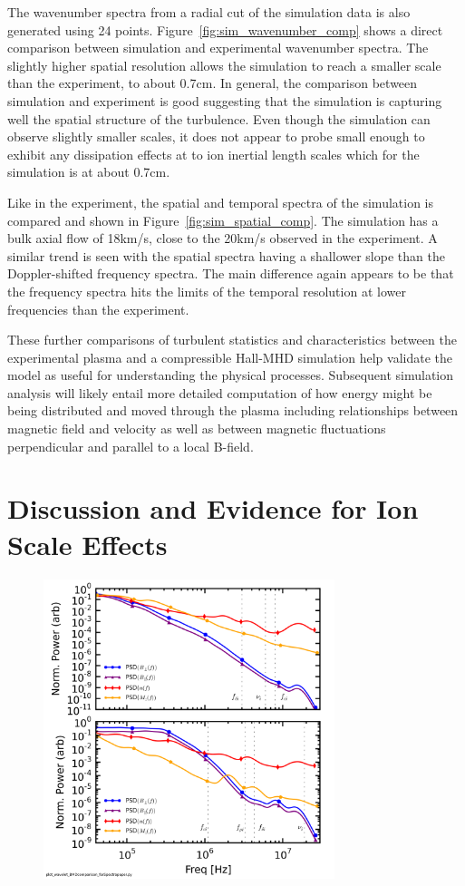\documentclass[aip,prl,amsmath,amssymb,reprint,superscriptaddress]{revtex4-1} %
\begin{document}
The wavenumber spectra from a radial cut of the simulation data is also generated using 24 points. Figure~\ref{fig:sim_wavenumber_comp} shows a direct comparison between simulation and experimental wavenumber spectra. The slightly higher spatial resolution allows the simulation to reach a smaller scale than the experiment, to about 0.7cm. In general, the comparison between simulation and experiment is good suggesting that the simulation is capturing well the spatial structure of the turbulence. Even though the simulation can observe slightly smaller scales, it does not appear to probe small enough to exhibit any dissipation effects at to ion inertial length scales which for the simulation is at about 0.7cm.

Like in the experiment, the spatial and temporal spectra of the simulation is compared and shown in Figure~\ref{fig:sim_spatial_comp}. The simulation has a bulk axial flow of 18km/s, close to the 20km/s observed in the experiment. A similar trend is seen with the spatial spectra having a shallower slope than the Doppler-shifted frequency spectra. The main difference again appears to be that the frequency spectra hits the limits of the temporal resolution at lower frequencies than the experiment.

These further comparisons of turbulent statistics and characteristics between the experimental plasma and a compressible Hall-MHD simulation help validate the model as useful for understanding the physical processes. Subsequent simulation analysis will likely entail more detailed computation of how energy might be being distributed and moved through the plasma including relationships between magnetic field and velocity as well as between magnetic fluctuations perpendicular and parallel to a local B-field.

\section{Discussion and Evidence for Ion Scale Effects}\label{sec:ionscale}

\begin{figure}[!htbp]
\centerline{
\includegraphics[width=8.5cm]{BvsDensvsFlowspec_1mWb_and_0mWbcomp_40t60us}}
\caption{\label{fig:BMD_comp}}
\end{figure}
\end{document}
